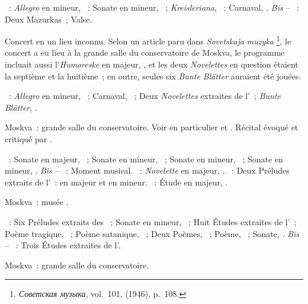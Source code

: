 \begin{description}
 \textsc{\Schumann{}}~: \emph{Allegro} en \kB mineur, ~; Sonate en
 \kF \Sharp mineur, ~; \emph{Kreisleriana}, ~; Carnaval,
 .
 \emph{Bis} -- \textsc{\Chopin{}}~: Deux Mazurkas~; Valse.
 \item[\DateWithWeekDay{1946-04-04}]
 Concert en un lieu inconnu.
 Selon un article paru dans \emph{Sovetskaja muzyka}%
 \footnote{\foreignlanguage{russian}{\emph{Советская музыка}}, vol.~101,
  (1946), p.~108.},
 le concert a eu lieu à la grande salle du conservatoire de Moskva, le
 programme incluait aussi l'\emph{Humoreske} en \kB \Flat majeur, ,
 et les deux \emph{Novelettes} en question étaient la septième et la
 huitième~; en outre, seules six \emph{Bunte Blätter} auraient été jouées.

 \textsc{\Schumann{}}~: \emph{Allegro} en \kB mineur, ~; Carnaval,
 ~; Deux \emph{Novelettes} extraites de l'~; \emph{Bunte
 Blätter}, .
 \item[\DateWithWeekDay{1946-04-17}]
 Moskva~: grande salle du conservatoire.
 Voir en particulier \citet[p.~442]{Milshteyn82a} et
 \citet[p.~394]{Nikonovich08}.
 Récital évoqué et critiqué par \citet[p.~91]{Zitomirsky46}.

 \textsc{\Beethoven{}}~: Sonate en \kE \Flat majeur, ~; Sonate en
 \kF mineur, ~; Sonate en \kC \Sharp mineur,  ~;
 Sonate en \kC mineur, .
 \emph{Bis} -- \textsc{\Schubert{}}~: Moment musical.
 \textsc{\Schumann{}}~: \emph{Novelette} en \kE majeur, 
 .
 \textsc{\Chopin{}}~: Deux Préludes extraits de l'~:  en
 \kA majeur et  en \kF \Sharp mineur.
 \textsc{\Scriabine{}}~: Étude en \kD \Flat majeur,  .
 \item[\DateWithWeekDay{1946-04-28}]
 Moskva~: musée \Scriabine{}.

 \textsc{\Scriabine{}}~: Six Préludes extraits des ~;
 Sonate en \kF \Sharp mineur, ~; Huit Études extraites de
 l'~; Poème tragique, ~; Poème satanique, ~; Deux
 Poèmes, ~; Poème,  ~; Sonate, .
 \emph{Bis} -- \textsc{\Scriabine{}}~: Trois Études extraites de l'.
 \item[\DateWithWeekDay{1946-05-15}]
 Moskva~: grande salle du conservatoire.


\end{description}
